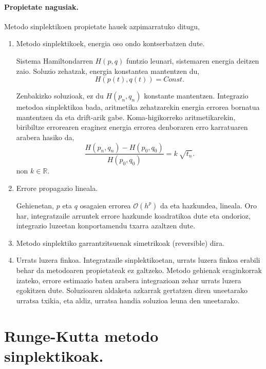 \paragraph*{Propietate nagusiak.}Metodo sinplektikoen propietate hauek azpimarratuko ditugu,
\begin{enumerate}

\item Metodo sinplektikoek, energia oso ondo kontserbatzen dute.

Sistema Hamiltondarren $H(p,q)$ funtzio leunari, sistemaren energia deitzen zaio. Soluzio zehatzak, energia konstantea mantentzen du,
\begin{equation*}
H(p(t),q(t))=Const.
\end{equation*}

Zenbakizko soluzioak, ez du $H(p_n,q_n)$  konstante mantentzen. Integrazio metodoa sinplektikoa bada, aritmetika zehatzarekin energia errorea bornatua mantentzen da eta drift-arik gabe. Koma-higikorreko aritmetikarekin, biribiltze errorearen eraginez energia errorea denboraren erro karratuaren arabera hasiko da,
\begin{equation*}
\frac{H(p_n,q_n)-H(p_0,q_0)}{H(p_0,q_0)}=k \ \sqrt{t_n}.
\end{equation*}
non $k\in \mathbb{R}$.

\item Errore propagazio lineala.

Gehienetan, $p$ eta $q$ osagaien errorea $\mathcal{O}(h^p)$ da eta hazkundea, lineala. Oro har, integratzaile arruntek errore hazkunde koadratikoa dute eta ondorioz, integrazio luzeetan konportamendu txarra azaltzen dute.

\item Metodo sinplektiko garrantzitsuenak simetrikoak (reversible) dira.

\item Urrats luzera finkoa. Integratzaile sinplektikoetan, urrats luzera finkoa erabili behar da metodoaren propietateak ez galtzeko.  Metodo gehienak eraginkorrak izateko, errore estimazio baten arabera integrazioan zehar urrats luzera egokitzen dute. Soluzioaren aldaketa azkarrak gertatzen diren uneetarako urratsa txikia, eta aldiz, urratsa handia soluzioa leuna den uneetarako.   

\end{enumerate} 

\section{Runge-Kutta metodo sinplektikoak.}

